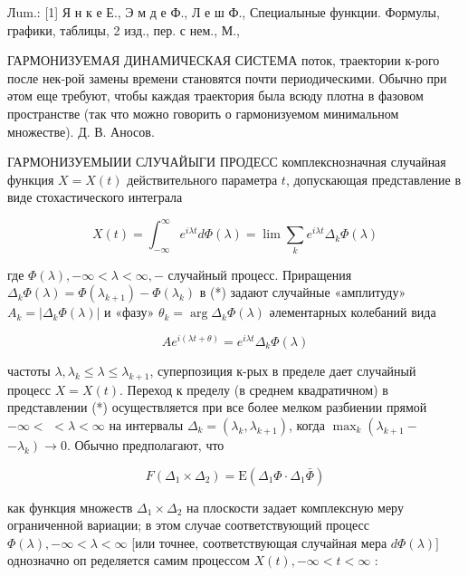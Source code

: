 \documentclass[10pt]{article}
\begin{document}
Лum.: [1] Я н к е Е., Э м д е Ф., Л е ш Ф., Специалыные функции. Формулы, графики, таблицы, 2 изд., пер. с нем., М.,



ГАРМОНИЗУЕМАЯ ДИНАМИЧЕСКАЯ СИСТЕМА поток, траектории к-рого после нек-рой замены времени становятся почти периодическими. Обычно при әтом еще требуют, чтобы каждая траектория была всюду плотна в фазовом пространстве (так что можно говорить о гармонизуемом минимальном множестве). Д. В. Аносов.



ГАРМОНИЗУЕМЫИИ СЛУЧАЙЫГИ ПРОДЕСС комплекснозначная случайная функция $X=X(t)$ действительного параметра $t$, допускающая представление в виде стохастического интеграла



\[

X(t)=\int_{-\infty}^{\infty} e^{i \lambda t} d \Phi(\lambda)=\lim \sum_{k} e^{i \lambda t} \Delta_{k} \Phi(\lambda)

\]



где $\Phi(\lambda),-\infty<\lambda<\infty,-$ случайный процесс. Приращения $\Delta_{k} \Phi(\lambda)=\Phi\left(\lambda_{k+1}\right)-\Phi\left(\lambda_{k}\right)$ в (*) задают случайные «амплитуду» $A_{k}=\left|\Delta_{k} \Phi(\lambda)\right|$ и «фазу» $\theta_{k}=\arg \Delta_{k} \Phi(\lambda)$ әлементарных колебаний вида



\[

A e^{i(\lambda t+\theta)}=e^{i \lambda t} \Delta_{k} \Phi(\lambda)

\]



частоты $\lambda, \lambda_{k} \leqslant \lambda \leqslant \lambda_{k+1}$, суперпозиция к-рых в пределе дает случайный процесс $X=X(t)$. Переход к пределу (в среднем квадратичном) в представлении (*) осуществляется при все более мелком разбиении прямой $-\infty<$ $<\lambda<\infty$ на интервалы $\Delta_{k}=\left(\lambda_{k}, \lambda_{k+1}\right)$, когда $\max _{k}\left(\lambda_{k+1}-\right.$ $\left.-\lambda_{k}\right) \rightarrow 0$. Обычно предполагают, что



\[

F\left(\Delta_{1} \times \Delta_{2}\right)=\mathrm{E}\left(\Delta_{1} \Phi \cdot \Delta_{1} \bar{\Phi}\right)

\]



как функция множеств $\Delta_{1} \times \Delta_{2}$ на плоскости задает комплексную меру ограниченной вариации; в этом случае соответствующий процесс $\Phi(\lambda),-\infty<\lambda<\infty$ [или точнее, соответствующая случайная мера $d \Phi(\lambda)]$ однозначно оп ределяется самим процессом $X(t),-\infty<t<\infty$ :
\end{document}
